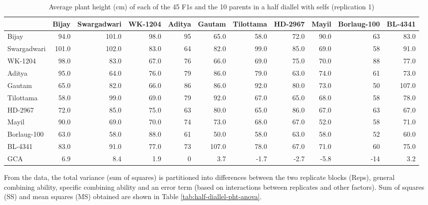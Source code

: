 \documentclass[nofonts,]{tufte-handout}
\begin{document}
\begin{longtable}[t]{lrrrrrrrrrr}
\caption{\label{tab:half-diallel-pht}Average plant height (cm) of each of the 45 F1s and the 10 parents in a half diallel with selfs (replication 1)}\\
\toprule
  & Bijay & Swargadwari & WK-1204 & Aditya & Gautam & Tilottama & HD-2967 & Mayil & Borlaug-100 & BL-4341\\
\midrule
Bijay & 94.0 & 101.0 & 98.0 & 95 & 65.0 & 58.0 & 72.0 & 90.0 & 63 & 83.0\\
Swargadwari & 101.0 & 102.0 & 83.0 & 64 & 82.0 & 99.0 & 85.0 & 69.0 & 58 & 91.0\\
WK-1204 & 98.0 & 83.0 & 67.0 & 76 & 66.0 & 69.0 & 75.0 & 70.0 & 88 & 77.0\\
Aditya & 95.0 & 64.0 & 76.0 & 79 & 86.0 & 79.0 & 63.0 & 74.0 & 61 & 73.0\\
Gautam & 65.0 & 82.0 & 66.0 & 86 & 86.0 & 92.0 & 80.0 & 73.0 & 50 & 107.0\\
\addlinespace
Tilottama & 58.0 & 99.0 & 69.0 & 79 & 92.0 & 67.0 & 65.0 & 68.0 & 58 & 78.0\\
HD-2967 & 72.0 & 85.0 & 75.0 & 63 & 80.0 & 65.0 & 86.0 & 67.0 & 63 & 67.0\\
Mayil & 90.0 & 69.0 & 70.0 & 74 & 73.0 & 68.0 & 67.0 & 52.0 & 58 & 71.0\\
Borlaug-100 & 63.0 & 58.0 & 88.0 & 61 & 50.0 & 58.0 & 63.0 & 58.0 & 52 & 60.0\\
BL-4341 & 83.0 & 91.0 & 77.0 & 73 & 107.0 & 78.0 & 67.0 & 71.0 & 60 & 75.0\\
\addlinespace
GCA & 6.9 & 8.4 & 1.9 & 0 & 3.7 & -1.7 & -2.7 & -5.8 & -14 & 3.2\\
\bottomrule
\end{longtable}

From the data, the total variance (sum of squares) is partitioned into
differences between the two replicate blocks (Reps), general combining
ability, specific combining ability and an error term (based on
interactions between replicates and other factors). Sum of squares (SS)
and mean squares (MS) obtained are shown in Table
\ref{tab:half-diallel-pht-anova}.
\end{document}
